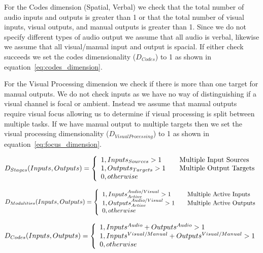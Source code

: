 For the Codes dimension (Spatial, Verbal) we check that the total number of audio inputs and outputs is greater than 1 or that the total number of visual inputs, visual outputs, and manual outputs is greater than 1.  Since we do not specify different types of audio output we assume that all audio is verbal, likewise we assume that all visual/manual input and output is spacial.  If either check succeeds we set the codes dimensionality ($D_{Codes}$) to 1 as shown in equation~\ref{eq:codes_dimension}.

For the Visual Processing dimension we check if there is more than one target for manual outputs.  We do not check inputs as we have no way of distinguishing if a visual channel is focal or ambient.  Instead we assume that manual outputs require visual focus allowing us to determine if visual processing is split between multiple tasks.  If we have manual output to multiple targets then we set the visual processing dimensionality ($D_{Visual Processing}$) to 1 as shown in equation~\ref{eq:focus_dimension}.

\begin{equation}
D_{Stages}(Inputs, Outputs) = \left\{ 
  \begin{array}{l l}
    1, Inputs_{Sources} > 1 & \quad \text{Multiple Input Sources}\\
    1, Outputs_{Targets} > 1 & \quad \text{Multiple Output Targets}\\
    0, otherwise
  \end{array}
  \right.
  \label{eq:stage_dimension}
\end{equation}

\begin{equation}
D_{Modalities}(Inputs, Outputs) = \left\{ 
  \begin{array}{l l}
    1, Inputs_{Active}^{Audio/Visual} > 1 & \quad \text{Multiple Active Inputs}\\
    1, Outputs_{Active}^{Audio/Visual} > 1 & \quad \text{Multiple Active Outputs}\\
    0, otherwise
  \end{array}
  \right.
  \label{eq:modality_dimension}
\end{equation}

\begin{equation}
D_{Codes}(Inputs, Outputs) = \left\{ 
  \begin{array}{l l}
    1, Inputs^{Audio} + Outputs^{Audio} > 1\\
    1, Inputs^{Visual/Manual} + Outputs^{Visual/Manual} > 1\\
    0, otherwise
  \end{array}
  \right.
  \label{eq:codes_dimension}
\end{equation}

